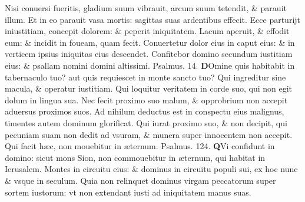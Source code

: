 \documentclass[a5paper,10pt]{book}
\def\ae{æ}
\begin{document}
\begin{multicols*}{2}
\newline \color{red} N\color{black}isi conuersi fueritis, gladium suum vibrauit, arcum suum tetendit, \& parauit illum.
\newline \color{red} E\color{black}t in eo parauit vasa mortis: sagittas suas ardentibus effecit.
\newline \color{red} E\color{black}cce parturijt iniustitiam, concepit dolorem: \& peperit iniquitatem.
\newline \color{red} L\color{black}acum aperuit, \& effodit eum: \& incidit in foueam, quam fecit.
\newline \color{red} C\color{black}onuertetur dolor eius in caput eius: \& in verticem ipsius iniquitas eius descendet.
\newline \color{red} C\color{black}onfitebor domino secundum iustitiam eius: \& psallam nomini domini altissimi. \quad \color{red} Psalmus. 14. \color{black}
\vspace{-.5em}
\lettrine[lines=2]{\bfseries \color{red} D}{}Omine quis habitabit in tabernaculo tuo? aut quis requiescet in monte sancto tuo?
\newline \color{red} Q\color{black}ui ingreditur sine macula, \& operatur iustitiam.
\newline \color{red} Q\color{black}ui loquitur veritatem in corde suo, qui non egit dolum in lingua sua.
\newline \color{red} N\color{black}ec fecit proximo suo malum, \& opprobrium non accepit aduersus proximos suos.
\newline \color{red} A\color{black}d nihilum deductus est in conspectu eius malignus, timentes autem dominum glorificat.
\newline \color{red} Q\color{black}ui iurat proximo suo, \& non decipit, qui pecuniam suam non dedit ad vsuram, \& munera super innocentem non accepit.
\newline \color{red} Q\color{black}ui facit h\ae c, non mouebitur in \ae ternum. \quad \color{red} Psalmus. 124. \color{black}
\vspace{-.5em}
\lettrine[lines=2]{\bfseries \color{red} Q}{}Vi confidunt in domino: sicut mons Sion, non commouebitur in \ae ternum, qui habitat in Ierusalem.
\newline \color{red} M\color{black}ontes in circuitu eius: \& dominus in circuitu populi sui, ex hoc nunc \& vsque in seculum.
\newline \color{red} Q\color{black}uia non relinquet dominus virgam peccatorum super sortem iustorum: vt non extendant iusti ad iniquitatem manus suas.

\end{multicols*}
\end{document}
